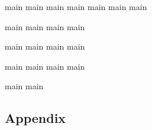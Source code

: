 \documentclass[graybox, envcountchap, tocaftauthskip, 12pt]{svmult}
\begin{document}
\frontmatter%

%
%



\setcounter{tocdepth}{1}
\tableofcontents




\mainmatter%




{main}
{main}
{main}
{main}
{main}
{main}
{main}


{main}
{main}
{main}
{main}


{main}
{main}
{main}
{main}


{main}
{main}
{main}
{main}


{main}
{main}

%

\backmatter%

\begin{partbacktext}
\part{Appendix}

\appendix


\end{partbacktext}


\end{document}
